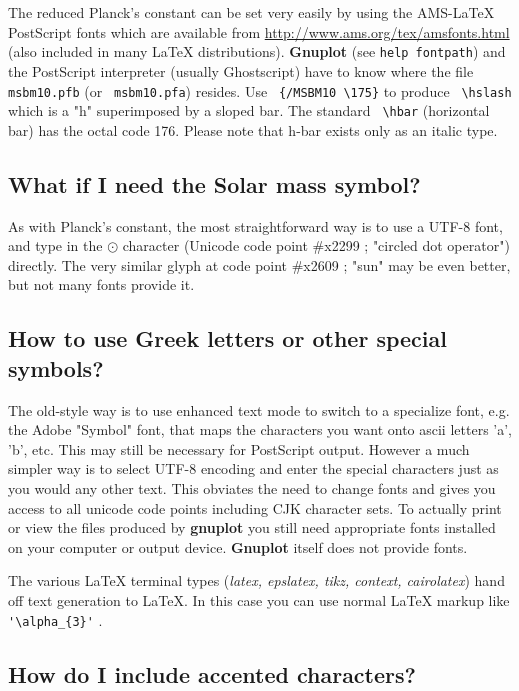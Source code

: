 \documentclass[a4paper,11pt]{article}
\def\http#1{{\small\href{http://#1}{\url{http://#1}}}}
\newcommand{\http}[1]%
            {\htmladdnormallink{\latex{\url{http://#1}}%
                    \html{\textit{http://#1}}}%
                {http://#1}%
            }
\newcommand{\gnuplot}{\textbf{gnuplot }}
\newcommand{\Gnuplot}{\textbf{Gnuplot }}
\begin{document}
The reduced Planck's constant can be set very easily by using the
AMS-LaTeX PostScript fonts which are available from
\http{www.ams.org/tex/amsfonts.html} (also included in many LaTeX
distributions). \Gnuplot{} (see \verb+help fontpath+) and the
PostScript interpreter (usually Ghostscript) have to know where the
file \verb+ msbm10.pfb+ (or \verb+ msbm10.pfa+) resides. Use
\verb+ {/MSBM10 \175}+ to produce \verb+ \hslash+ which is a "h"
superimposed by a sloped bar. The standard \verb+ \hbar+ (horizontal
bar) has the octal code 176. Please note that h-bar exists only as an
italic type.

\subsection{What if I need the Solar mass symbol?}

As with Planck's constant, the most straightforward way is to use a
UTF-8 font, and type in the $\odot$ character (Unicode code point \#x2299 ; "circled dot operator") directly.
The very similar glyph at code point \#x2609 ; "sun" may be even better, but not many fonts provide it.

\subsection{How to use Greek letters or other special symbols?}

The old-style way is to use enhanced text mode to switch to a specialize font,
e.g. the Adobe "Symbol" font, that maps the characters you want onto ascii
letters 'a', 'b', etc.  This may still be necessary for PostScript output.
However a much simpler way is to select UTF-8 encoding and enter the
special characters just as you would any other text.
This obviates the need to change fonts and gives you access to all unicode
code points including CJK character sets.  To actually print or view the
files produced by \gnuplot you still need appropriate fonts installed on
your computer or output device.  \Gnuplot itself does not provide fonts.

The various \LaTeX{} terminal types (\textit{latex, epslatex, tikz, context, cairolatex})
hand off text generation to \LaTeX{}. In this case you can use normal \LaTeX{}
markup like \verb+'\alpha_{3}'+ .

\subsection{How do I include accented characters?}
\end{document}
